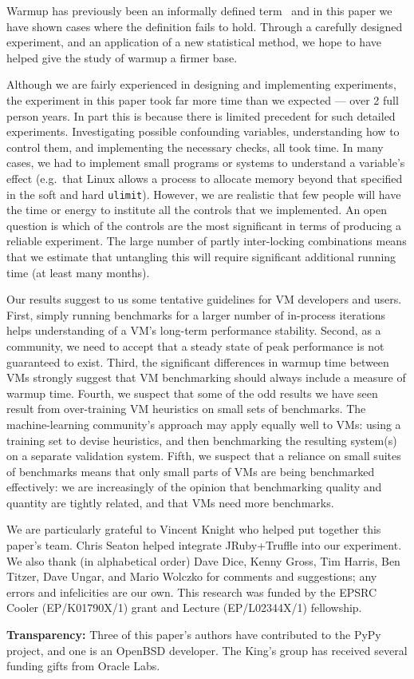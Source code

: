 \documentclass[acmlarge]{acmart}\settopmatter{printfolios=true}
\begin{document}
Warmup has previously been an informally defined term~\cite{seaton15phd} and in this
paper we have shown cases where the definition fails to hold. Through a carefully
designed experiment, and an application of a new statistical method, we hope
to have helped give the study of warmup a firmer base.

Although we are fairly experienced in designing and implementing
experiments, the experiment in this paper took far more time than we expected
--- over 2 full person years. In part this is because there is limited precedent for such detailed
experiments. Investigating possible confounding variables, understanding how to
control them, and implementing the necessary checks, all took time. In many
cases, we had to implement small programs or systems to understand a variable's
effect (e.g.~that Linux allows a process to allocate memory beyond that
specified in the soft and hard \texttt{ulimit}). However, we are realistic that
few people will have the time or energy to institute all the controls that we
implemented. An open question is which of the controls are the most significant
in terms of producing a reliable experiment. The large number of partly
inter-locking combinations means that we estimate that untangling this will
require significant additional running time (at least many months).

Our results suggest to us some tentative guidelines for VM
developers and users. First, simply running benchmarks for a larger number of
in-process iterations helps understanding of a VM's long-term
performance stability. Second, as a community, we need to accept that a steady
state of peak performance is not guaranteed to exist. Third, the significant
differences in warmup time between VMs strongly suggest that VM benchmarking
should always include a measure of warmup time. Fourth, we suspect that some of the odd
results we have seen result from over-training VM heuristics on small sets of
benchmarks. The machine-learning community's approach may apply
equally well to VMs: using a training set to devise heuristics, and then
benchmarking the resulting system(s) on a separate validation system. Fifth, we suspect
that a reliance on small suites of benchmarks means that only
small parts of VMs are being benchmarked effectively: we are increasingly of the
opinion that benchmarking quality and quantity are tightly related, and that VMs
need more benchmarks.

\begin{acks}
We are particularly grateful to Vincent Knight
who helped put together this paper's team. Chris Seaton
helped integrate JRuby+Truffle into our experiment. We also thank (in alphabetical order) Dave Dice, Kenny
Gross, Tim Harris, Ben Titzer, Dave Ungar, and Mario Wolczko for comments and suggestions; any
errors and infelicities are our own. This research was funded by the EPSRC
Cooler (EP/K01790X/1) grant and Lecture (EP/L02344X/1) fellowship.

\textbf{Transparency:} Three of this paper's authors have contributed
to the PyPy project, and one is an OpenBSD developer. The
King's group has received several funding gifts from Oracle Labs.
\end{acks}
\end{document}
